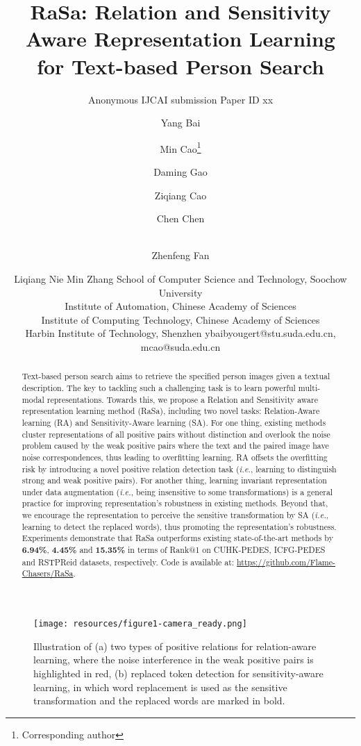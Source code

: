 \documentclass{article}
\title{RaSa: Relation and Sensitivity Aware Representation Learning \\for Text-based Person Search}
\author{
    Anonymous IJCAI submission 
    \affiliations
    Paper ID xx
}
\author{
Yang Bai\and
Min Cao\thanks{Corresponding author}\and
Daming Gao\and
Ziqiang Cao\and
Chen Chen\and\\
Zhenfeng Fan\and
Liqiang Nie\And
Min Zhang
\affiliations
School of Computer Science and Technology, Soochow University\\
Institute of Automation, Chinese Academy of Sciences\\
Institute of Computing Technology, Chinese Academy of Sciences\\
Harbin Institute of Technology, Shenzhen
\emails
ybaibyougert@stu.suda.edu.cn,
mcao@suda.edu.cn
}
\begin{document}
\maketitle

\begin{abstract}
Text-based person search aims to retrieve the specified person images given a textual description. 
The key to tackling such a challenging task is to learn powerful multi-modal representations. 
Towards this, we propose a Relation and Sensitivity aware representation learning method (RaSa), including two novel tasks: Relation-Aware learning (RA) and Sensitivity-Aware learning (SA).
For one thing, existing methods cluster representations of all positive pairs without distinction and overlook the noise problem caused by the weak positive pairs where the text and the paired image have noise correspondences, thus leading to overfitting learning.
RA offsets the overfitting risk by introducing a novel positive relation detection task (\emph{i.e.}, learning to distinguish strong and weak positive pairs).
For another thing, learning invariant representation under data augmentation (\emph{i.e.}, being insensitive to some transformations) is a general practice for improving representation's robustness in existing methods. 
Beyond that, we encourage the representation to perceive the sensitive transformation by SA (\emph{i.e.}, learning to detect the replaced words), thus promoting the representation's robustness.
Experiments demonstrate that RaSa outperforms existing state-of-the-art methods by \textbf{6.94\%}, \textbf{4.45\%} and \textbf{15.35\%} in terms of Rank@1 on CUHK-PEDES, ICFG-PEDES and RSTPReid datasets, respectively.
Code is available at: \href{https://github.com/Flame-Chasers/RaSa}{https://github.com/Flame-Chasers/RaSa}.
\end{abstract}



\begin{figure}[ht]
\centering
\vspace{0.5cm}
\texttt{[image: resources/figure1-camera\_ready.png]}
\caption{Illustration of 
        (a) two types of positive relations for relation-aware learning, where the noise interference in the weak positive pairs is highlighted in red,
        (b) replaced token detection for sensitivity-aware learning, in which word replacement is used as the sensitive transformation and the replaced words are marked in bold.}
\label{fig1}
\end{figure}
\end{document}
